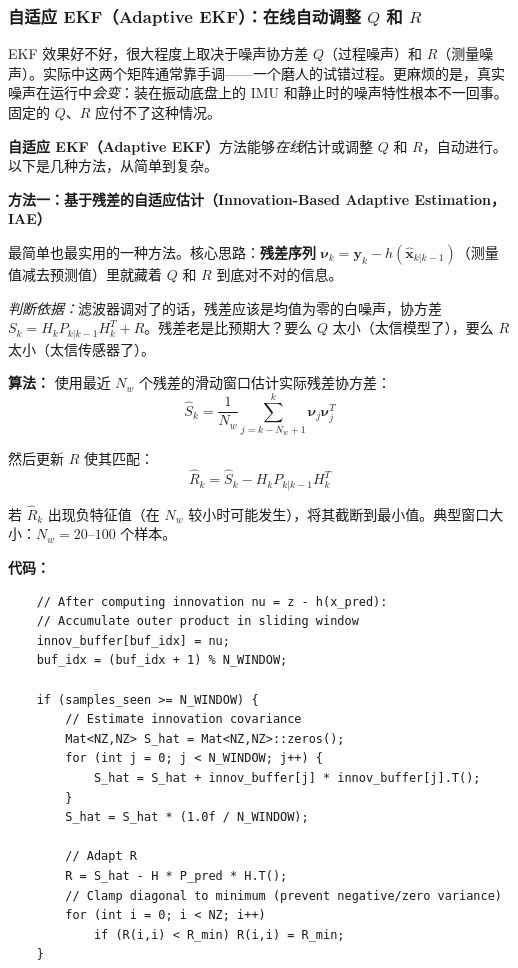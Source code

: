 \subsubsection{自适应 EKF（Adaptive EKF）：在线自动调整 \texorpdfstring{$Q$}{Q} 和 \texorpdfstring{$R$}{R}}

EKF 效果好不好，很大程度上取决于噪声协方差 $Q$（过程噪声）和 $R$（测量噪声）。实际中这两个矩阵通常靠手调——一个磨人的试错过程。更麻烦的是，真实噪声在运行中\textit{会变}：装在振动底盘上的 IMU 和静止时的噪声特性根本不一回事。固定的 $Q$、$R$ 应付不了这种情况。

\textbf{自适应 EKF（Adaptive EKF）}方法能够\textit{在线}估计或调整 $Q$ 和 $R$，自动进行。以下是几种方法，从简单到复杂。

\textbf{方法一：基于残差的自适应估计（Innovation-Based Adaptive Estimation，IAE）}

最简单也最实用的一种方法。核心思路：\textbf{残差序列} $\boldsymbol{\nu}_k = \mathbf{y}_k - h(\hat{\mathbf{x}}_{k|k-1})$（测量值减去预测值）里就藏着 $Q$ 和 $R$ 到底对不对的信息。

\textit{判断依据：}滤波器调对了的话，残差应该是均值为零的白噪声，协方差 $S_k = H_k P_{k|k-1} H_k^T + R$。残差老是比预期大？要么 $Q$ 太小（太信模型了），要么 $R$ 太小（太信传感器了）。

\textbf{算法：} 使用最近 $N_w$ 个残差的滑动窗口估计实际残差协方差：
\begin{equation}
\hat{S}_k = \frac{1}{N_w} \sum_{j=k-N_w+1}^{k} \boldsymbol{\nu}_j \boldsymbol{\nu}_j^T
\end{equation}

然后更新 $R$ 使其匹配：
\begin{equation}
\hat{R}_k = \hat{S}_k - H_k P_{k|k-1} H_k^T
\end{equation}

若 $\hat{R}_k$ 出现负特征值（在 $N_w$ 较小时可能发生），将其截断到最小值。典型窗口大小：$N_w = 20$--$100$ 个样本。

\textbf{代码：}
\begin{verbatim}
    // After computing innovation nu = z - h(x_pred):
    // Accumulate outer product in sliding window
    innov_buffer[buf_idx] = nu;
    buf_idx = (buf_idx + 1) % N_WINDOW;

    if (samples_seen >= N_WINDOW) {
        // Estimate innovation covariance
        Mat<NZ,NZ> S_hat = Mat<NZ,NZ>::zeros();
        for (int j = 0; j < N_WINDOW; j++) {
            S_hat = S_hat + innov_buffer[j] * innov_buffer[j].T();
        }
        S_hat = S_hat * (1.0f / N_WINDOW);

        // Adapt R
        R = S_hat - H * P_pred * H.T();
        // Clamp diagonal to minimum (prevent negative/zero variance)
        for (int i = 0; i < NZ; i++)
            if (R(i,i) < R_min) R(i,i) = R_min;
    }
\end{verbatim}

